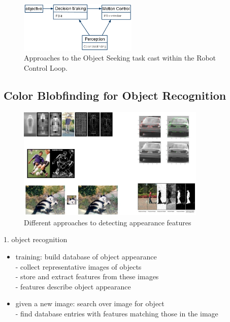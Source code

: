 \begin{figure}[!h]
\centering
\includegraphics[width=0.5\textwidth]{figures/6_control_loop.png}
\caption{Approaches to the Object Seeking task cast within the Robot Control Loop.}
\label{fig:6_control_loop}
\end{figure}

\subsection{Color Blobfinding for Object Recognition}

\begin{figure}[!h]
\centering
\includegraphics[width=0.8\textwidth]{figures/6_features.jpg}
\caption{Different approaches to detecting appearance features}
\end{figure}

1. object recognition
\begin{itemize}
\item training: build database of object appearance\\
- collect representative images of objects\\
- store and extract features from these images\\
- features describe object appearance\\
\item given a new image: search over image for object\\
- find database entries with features matching those in the image
\end{itemize}

